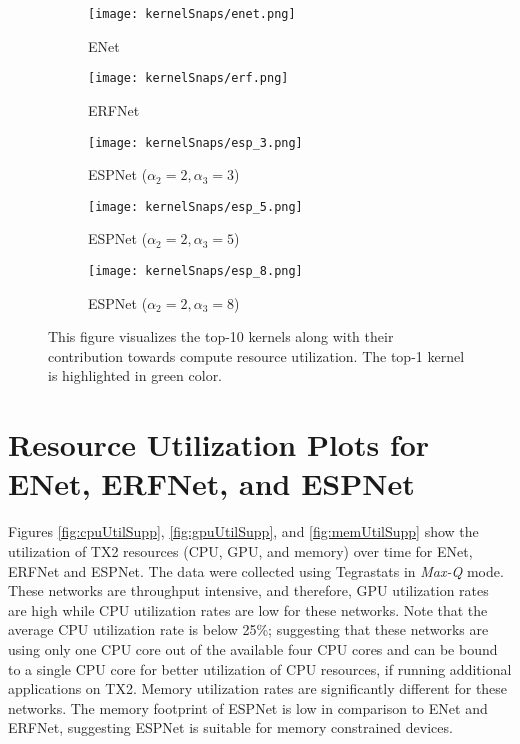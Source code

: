 \documentclass[runningheads]{llncs}
\begin{document}
\begin{figure}[t!]
	\centering
	\begin{subfigure}[b]{0.49\columnwidth}
		\centering
		\texttt{[image: kernelSnaps/enet.png]}
		\caption{ENet}
		\label{fig:enetKernSup}
	\end{subfigure}
	\hfill
	\begin{subfigure}[b]{0.49\columnwidth}
		\centering
		\texttt{[image: kernelSnaps/erf.png]}
		\caption{ERFNet}
		\label{fig:erfKernSup}
	\end{subfigure}
	\vfill
	\begin{subfigure}[b]{0.49\columnwidth}
		\centering
		\texttt{[image: kernelSnaps/esp\_3.png]}
		\caption{ESPNet ($\alpha_2=2, \alpha_3=3$)}
		\label{fig:espOneSup}
	\end{subfigure}
	\hfill
	\begin{subfigure}[b]{0.49\columnwidth}
		\centering
		\texttt{[image: kernelSnaps/esp\_5.png]}
		\caption{ESPNet ($\alpha_2=2, \alpha_3=5$)}
		\label{fig:espTwoSup}
	\end{subfigure}
	\vfill
	\begin{subfigure}[b]{\columnwidth}
		\centering
		\texttt{[image: kernelSnaps/esp\_8.png]}
		\caption{ESPNet ($\alpha_2=2, \alpha_3=8$)}
		\label{fig:espThreeSup}
	\end{subfigure}
	\caption{This figure visualizes the top-10 kernels along with their contribution towards compute resource utilization. The top-1 kernel is highlighted in green color.}
	\label{fig:topKernelVisSup}
\end{figure}

\section{Resource Utilization Plots for ENet, ERFNet, and ESPNet}
\label{sec:resourceUtilTop}

Figures \ref{fig:cpuUtilSupp},  \ref{fig:gpuUtilSupp}, and  \ref{fig:memUtilSupp} show the utilization of TX2 resources (CPU, GPU, and memory) over time for ENet, ERFNet and ESPNet. The data were collected using Tegrastats in \textit{Max-Q} mode. These networks are throughput intensive, and therefore, GPU utilization rates are high while CPU utilization rates are low for these networks. Note that the average CPU utilization rate is below 25\%; suggesting that these networks are using only one CPU core out of the available four CPU cores and can be bound to a single CPU core for better utilization of CPU resources, if running additional applications on TX2. Memory utilization rates are significantly different for these networks. The memory footprint of ESPNet is low in comparison to ENet and ERFNet, suggesting ESPNet is suitable for memory constrained devices.
\end{document}
